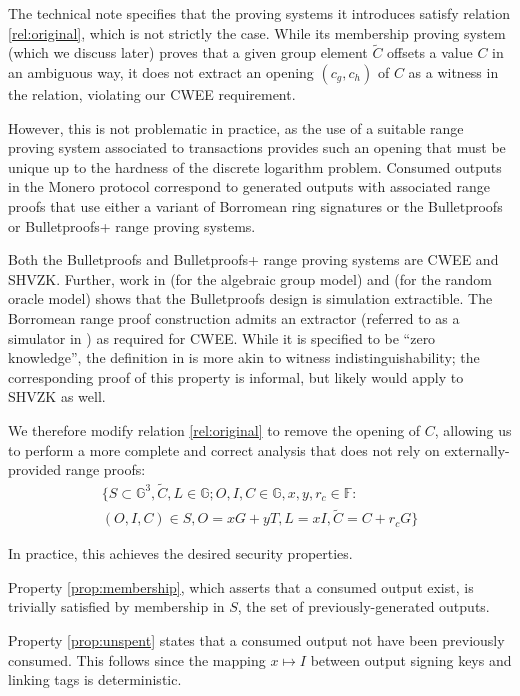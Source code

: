 \documentclass{article}
\theoremstyle{definition}
\newcommand{\GG}{\mathbb{G}}
\newcommand{\FF}{\mathbb{F}}
\newcommand{\wt}[1]{\widetilde{#1}}
\begin{document}
The technical note specifies that the proving systems it introduces satisfy relation \ref{rel:original}, which is not strictly the case.
While its membership proving system (which we discuss later) proves that a given group element $\wt{C}$ offsets a value $C$ in an ambiguous way, it does not extract an opening $(c_g, c_h)$ of $C$ as a witness in the relation, violating our CWEE requirement.

However, this is not problematic in practice, as the use of a suitable range proving system associated to transactions provides such an opening that must be unique up to the hardness of the discrete logarithm problem.
Consumed outputs in the Monero protocol correspond to generated outputs with associated range proofs that use either a variant of Borromean ring signatures \cite{borromean} or the Bulletproofs \cite{bp} or Bulletproofs+ \cite{bpp} range proving systems.

Both the Bulletproofs and Bulletproofs+ range proving systems are CWEE and SHVZK.
Further, work in \cite{bp_agm} (for the algebraic group model) and \cite{bp_rom} (for the random oracle model) shows that the Bulletproofs design is simulation extractible.
The Borromean range proof construction admits an extractor (referred to as a simulator in \cite{borromean}) as required for CWEE.
While it is specified to be ``zero knowledge'', the definition in \cite{borromean} is more akin to witness indistinguishability; the corresponding proof of this property is informal, but likely would apply to SHVZK as well.

We therefore modify relation \ref{rel:original} to remove the opening of $C$, allowing us to perform a more complete and correct analysis that does not rely on externally-provided range proofs:
\begin{multline}
	\label{rel:main}
	\Big\{ S \subset \GG^3, \wt{C}, L \in \GG; O, I, C \in \GG, x, y, r_c \in \FF : \\
	(O, I, C) \in S, O = x G + y T, L = x I, \wt{C} = C + r_c G \Big\}
\end{multline}

In practice, this achieves the desired security properties.

Property \ref{prop:membership}, which asserts that a consumed output exist, is trivially satisfied by membership in $S$, the set of previously-generated outputs.

Property \ref{prop:unspent} states that a consumed output not have been previously consumed.
This follows since the mapping $x \mapsto I$ between output signing keys and linking tags is deterministic.
\end{document}
